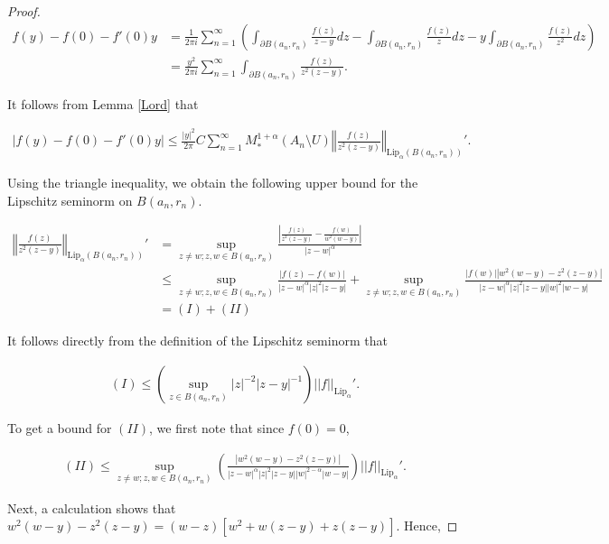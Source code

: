 \documentclass{article}
\theoremstyle{definition}
\begin{document}
\begin{proof}
\begin{align*}
    f(y)-f(0) -f'(0)y &= \frac{1}{2 \pi i} \sum_{n=1}^{\infty} \left(\int_{\partial B(a_n,r_n)} \frac{f(z)}{z-y} dz- \int_{\partial B(a_n,r_n)} \frac{f(z)}{z}dz -y\int_{\partial B(a_n,r_n)} \frac{f(z)}{z^2}dz\right) \\
    &= \frac{y^2}{2 \pi i} \sum_{n=1}^{\infty} \int_{\partial B(a_n,r_n)} \frac{f(z)}{z^2(z-y)}.
\end{align*}


\noindent It follows from Lemma \ref{Lord} that

\begin{align*}
    |f(y)-f(0) -f'(0)y| \leq \frac{|y|^2}{2\pi} C \sum_{n=1}^{\infty} M_*^{1+\alpha} (A_n \setminus U) \left\Vert \frac{f(z)}{z^2(z-y)} \right\Vert_{\text{Lip}_{\alpha}(B(a_n,r_n))}'.
\end{align*}


\noindent  Using the triangle inequality, we obtain the following upper bound for the Lipschitz seminorm on $B(a_n, r_n)$.

\begin{align*}
    \left\Vert \frac{f(z)}{z^2(z-y)} \right\Vert_{\text{Lip}_{\alpha}(B(a_n,r_n))}' &= \sup_{z \neq w; z,w \in B(a_n,r_n)} \frac{\left| \frac{f(z)}{z^2(z-y)} - \frac{f(w)}{w^2(w-y)} \right|}{|z-w|^{\alpha}} \\
    &\leq \sup_{z \neq w; z,w \in B(a_n,r_n)} \frac{|f(z)-f(w)|}{|z-w|^{\alpha} |z|^2 |z-y|} + \sup_{z \neq w; z,w \in B(a_n,r_n)} \frac{|f(w)| |w^2(w-y) -z^2(z-y)|}{|z-w|^{\alpha} |z|^2 |z-y| |w|^2 |w-y|}\\
    & = (I) + (II)
\end{align*}


\noindent It follows directly from the definition of the Lipschitz seminorm that 

\begin{align*}
(I) \leq \left( \sup_{z \in B(a_n,r_n)}|z|^{-2} |z-y|^{-1}\right) ||f||_{\text{Lip}_{\alpha}}'.
\end{align*}

\noindent To get a bound for $(II)$, we first note that since $f(0) = 0$, 

\begin{align*}
   (II)  \leq \sup_{z \neq w; z,w \in B(a_n,r_n)} \left( \frac{ |w^2(w-y) -z^2(z-y)|}{|z-w|^{\alpha} |z|^2 |z-y| |w|^{2-\alpha} |w-y|} \right) ||f||_{\text{Lip}_{\alpha}}'.
\end{align*}


\noindent Next, a calculation shows that $w^2(w-y) -z^2(z-y) = (w-z)[w^2+w(z-y)+z(z-y)]$. Hence,


\end{proof}
\end{document}
